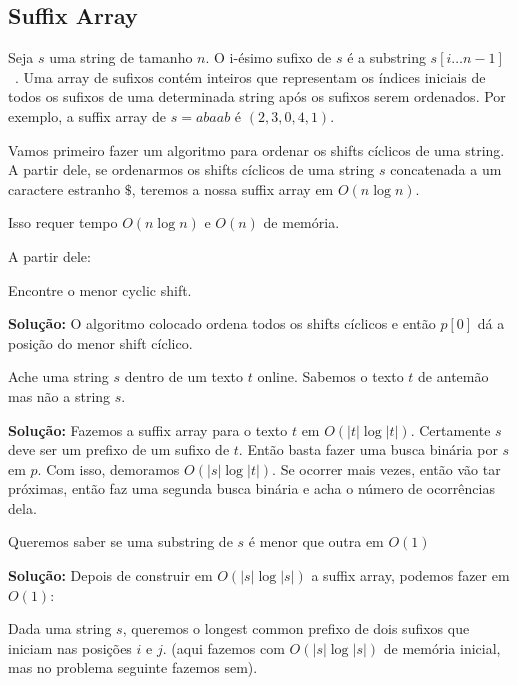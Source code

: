 \subsection{Suffix Array}

Seja $s$ uma string de tamanho $n$. O i-ésimo sufixo de $s$ é a substring $s[i \dots n-1]$~. Uma array de sufixos contém inteiros que representam os índices iniciais de todos os sufixos de uma determinada string após os sufixos serem ordenados. Por exemplo, a suffix array de $s = abaab$ é $(2,3,0,4,1)$.

Vamos primeiro fazer um algoritmo para ordenar os shifts cíclicos de uma string. A partir dele, se ordenarmos os shifts cíclicos de uma string $s$ concatenada a um caractere estranho $ \$$, teremos a nossa suffix array em $O(n \log n)$.


Isso requer tempo $O(n \log n)$ e $O(n)$ de memória.

A partir dele:


 Encontre o menor cyclic shift.

\textbf{Solução:} O algoritmo colocado ordena todos os shifts cíclicos e então $p[0]$ dá a posição do menor shift cíclico.

 Ache uma string $s$ dentro de um texto $t$ online. Sabemos o texto $t$ de antemão mas não a string $s$.

\textbf{Solução:} Fazemos a suffix array para o texto $t$ em $O(|t| \log |t|)$. Certamente $s$ deve ser um prefixo de um sufixo de $t$. Então basta fazer uma busca binária por $s$ em $p$. Com isso, demoramos $O(|s| \log |t|)$. Se ocorrer mais vezes, então vão tar próximas, então faz uma segunda busca binária e acha o número de ocorrências dela.

 Queremos saber se uma substring de $s$ é menor que outra em $O(1)$

\textbf{Solução:} Depois de construir em $O(|s| \log |s|)$ a suffix array, podemos fazer em $O(1)$:


 Dada uma string $s$, queremos o longest common prefixo de dois sufixos que iniciam nas posições $i$ e $j$. (aqui fazemos com $O(|s| \log |s|)$ de memória inicial, mas no problema seguinte fazemos sem).


